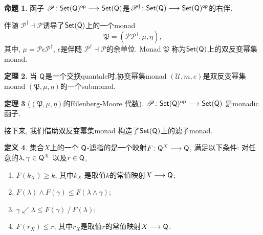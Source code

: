 \documentclass[UTF8]{beamer}
\theoremstyle{definition}
\newtheorem{thm}{定理}[section]
\newtheorem{prop}[thm]{命题}
\theoremstyle{definition}
\newtheorem{defn}[thm]{定义}
\DeclareMathOperator{\ldd}{/}
\newcommand{\sQ}{{\sf Q}}
\newcommand{\setQ}{{\sf Set}(\sQ)}
\newcommand{\Set}{\sf Set}
\numberwithin{equation}{section}
\begin{document}
\begin{frame}
\begin{prop}函子
$\mathscr{P} \colon \sf Set(\sQ)^{\sf op}\lra\sf Set(\sQ)$是$\mathscr{P}^\dagger\colon \sf Set(\sQ)\lra\sf Set(\sQ)^{\sf op}$的右伴.
\end{prop}
\pause 
伴随 $\mathscr{P}^\dag \dashv\mathscr{P}$诱导了$\setQ$上的一个monad $$\mathfrak{P}=(\mathscr{P} \mathscr{P}^\dag,\mu,\eta),$$ 其中,  $\mu=\mathscr{P} \epsilon\mathscr{P}^\dag$, $\epsilon$是伴随 $\mathscr{P}^\dag \dashv\mathscr{P}$的余单位. Monad $\mathfrak{P}$ 称为$\setQ$上的双反变幂集monad.
\end{frame}

\begin{frame}
\begin{thm}当 $\sQ$是一个交换quantale时,协变幂集monad $(\mathscr{U},m,e)$是双反变幂集monad $(\mathfrak{P},\mu,\eta)$的一个submonad.
\end{thm}

\end{frame}


\begin{frame}{}
\begin{thm}[$(\mathfrak{P},\mu,\eta)$的Eilenberg-Moore 代数]\label{main1} $\mathscr{P}\colon \setQ^{\rm op}\lra\setQ $ 是monadic函子. \end{thm}
\end{frame}

\begin{frame} 接下来, 我们借助双反变幂集monad 构造了$\Set(\sQ)$上的滤子monad.
\begin{defn} \label{Q-filter} 集合$X$上的一个 $\sQ$-滤指的是一个映射$F\colon \sQ^X\lra \sQ$, 满足以下条件: 对任意的$\lambda,\gamma\in \sQ^X$ 以及$r\in\sQ$, \begin{enumerate}[label=(F\arabic*)] \setlength{\itemsep}{0pt}
\item \label{FF1} $F(k_X)\geqslant k$, 其中$k_X$ 是取值$k$的常值映射$X\lra\sQ$; \item \label{FF2} $F(\lambda)\wedge F(\gamma)\leqslant F(\lambda\wedge\gamma)$; \item \label{FF3} $\gamma\swarrow\lambda  \leqslant F(\gamma)\ldd F(\lambda);$
\item\label{FF4}   $F(r_X)\leqslant r$, 其中$r_X$是取值$r$的常值映射$X\lra\sQ$.   \end{enumerate}
\end{defn}

\end{frame}
\end{document}

